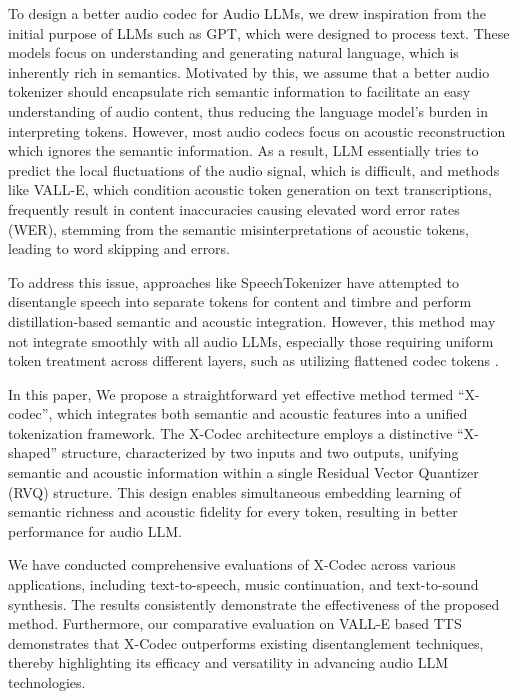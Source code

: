 To design a better audio codec for Audio LLMs, we drew inspiration from the initial purpose of LLMs such as GPT, which were designed to process text. These models focus on understanding and generating natural language, which is inherently rich in semantics. Motivated by this, we assume that a better audio tokenizer should encapsulate rich semantic information to facilitate an easy understanding of audio content, thus reducing the language model's burden in interpreting tokens. However, most audio codecs focus on acoustic reconstruction which ignores the semantic information. As a result, LLM essentially tries to predict the local fluctuations of the audio signal, which is difficult, and methods like VALL-E, which condition acoustic token generation on text transcriptions, frequently result in content inaccuracies causing elevated word error rates (WER), stemming from the semantic misinterpretations of acoustic tokens, leading to word skipping and errors.

To address this issue, approaches like SpeechTokenizer \cite{zhang2023speechtokenizer} have attempted to disentangle speech into separate tokens for content and timbre and perform distillation-based semantic and acoustic integration. However, this method may not integrate smoothly with all audio LLMs, especially those requiring uniform token treatment across different layers, such as utilizing flattened codec tokens \cite{yang2023uniaudio,copet2024simple}. 

In this paper, We propose a straightforward yet effective method termed ``X-codec'', which integrates both semantic and acoustic features into a unified tokenization framework. The X-Codec architecture employs a distinctive ``X-shaped'' structure, characterized by two inputs and two outputs, unifying semantic and acoustic information within a single Residual Vector Quantizer (RVQ) structure. This design enables simultaneous embedding learning of semantic richness and acoustic fidelity for every token, resulting in better performance for audio LLM. 

We have conducted comprehensive evaluations of X-Codec across various applications, including text-to-speech, music continuation, and text-to-sound synthesis. The results consistently demonstrate the effectiveness of the proposed method. Furthermore, our comparative evaluation on VALL-E based TTS demonstrates that X-Codec outperforms existing disentanglement techniques, thereby highlighting its efficacy and versatility in advancing audio LLM technologies.






